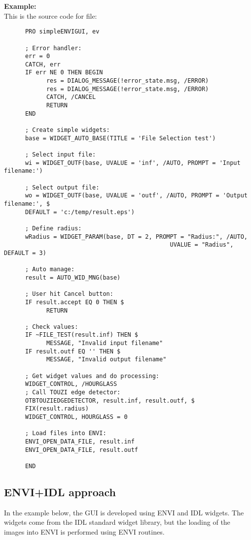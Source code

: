 \textbf{Example:}\\
      This is the source code for  file:\\
\begin{verbatim}
      PRO simpleENVIGUI, ev

      ; Error handler:
      err = 0
      CATCH, err
      IF err NE 0 THEN BEGIN
            res = DIALOG_MESSAGE(!error_state.msg, /ERROR)
            res = DIALOG_MESSAGE(!error_state.msg, /ERROR)
            CATCH, /CANCEL
            RETURN
      END

      ; Create simple widgets:
      base = WIDGET_AUTO_BASE(TITLE = 'File Selection test')

      ; Select input file:
      wi = WIDGET_OUTF(base, UVALUE = 'inf', /AUTO, PROMPT = 'Input filename:')

      ; Select output file:
      wo = WIDGET_OUTF(base, UVALUE = 'outf', /AUTO, PROMPT = 'Output filename:', $
      DEFAULT = 'c:/temp/result.eps')

      ; Define radius:
      wRadius = WIDGET_PARAM(base, DT = 2, PROMPT = "Radius:", /AUTO,
                                               UVALUE = "Radius",  DEFAULT = 3)

      ; Auto manage:
      result = AUTO_WID_MNG(base)

      ; User hit Cancel button:
      IF result.accept EQ 0 THEN $
            RETURN

      ; Check values:
      IF ~FILE_TEST(result.inf) THEN $
            MESSAGE, "Invalid input filename"
      IF result.outf EQ '' THEN $
            MESSAGE, "Invalid output filename"

      ; Get widget values and do processing:
      WIDGET_CONTROL, /HOURGLASS
      ; Call TOUZI edge detector:
      OTBTOUZIEDGEDETECTOR, result.inf, result.outf, $
      FIX(result.radius)
      WIDGET_CONTROL, HOURGLASS = 0

      ; Load files into ENVI:
      ENVI_OPEN_DATA_FILE, result.inf
      ENVI_OPEN_DATA_FILE, result.outf

      END
\end{verbatim}

\subsection{ENVI+IDL approach}\label{enviidlapp}
In the example below, the GUI is developed using ENVI and IDL widgets. The widgets come from the IDL standard widget library, 
but the loading of the images into ENVI is performed using ENVI routines.

